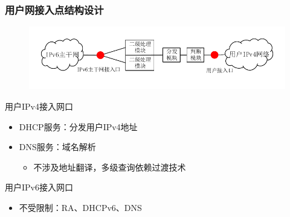 \documentclass{beamer}
\begin{document}
\begin{frame}
  \frametitle{用户网接入点结构设计}
  \begin{figure}
    \includegraphics[width=\textwidth]{figs/10-user-access-point-a.pdf}
  \end{figure}
  \vspace{-1em}

  \begin{block}{用户IPv4接入网口}
    \begin{itemize}
    \item DHCP服务：分发用户IPv4地址
    \item DNS服务：域名解析
      \begin{itemize}
      \item 不涉及地址翻译，多级查询依赖过渡技术
      \end{itemize}
    \end{itemize}
  \end{block}

  \begin{block}{用户IPv6接入网口}
    \begin{itemize}
    \item 不受限制：RA、DHCPv6、DNS
    \end{itemize}
  \end{block}
\end{frame}
\end{document}
